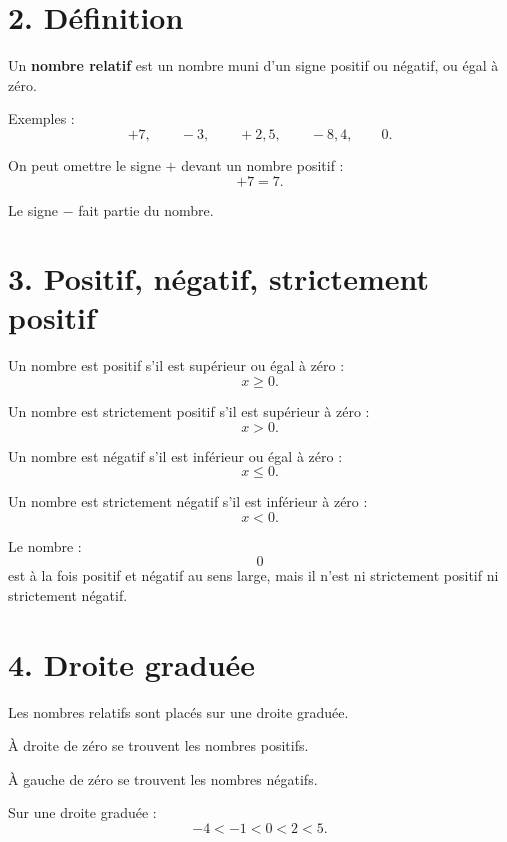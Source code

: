 \section{2. Définition}

\begin{definition}
Un \textbf{nombre relatif} est un nombre muni d'un signe positif ou négatif, ou égal à zéro.
\end{definition}

Exemples :
\[
+7,\qquad -3,\qquad +2{,}5,\qquad -8{,}4,\qquad 0.
\]

On peut omettre le signe $+$ devant un nombre positif :
\[
+7=7.
\]

Le signe $-$ fait partie du nombre.

\section{3. Positif, négatif, strictement positif}

Un nombre est positif s'il est supérieur ou égal à zéro :
\[
x\ge0.
\]

Un nombre est strictement positif s'il est supérieur à zéro :
\[
x>0.
\]

Un nombre est négatif s'il est inférieur ou égal à zéro :
\[
x\le0.
\]

Un nombre est strictement négatif s'il est inférieur à zéro :
\[
x<0.
\]

\begin{attention}
Le nombre :
\[
0
\]
est à la fois positif et négatif au sens large, mais il n'est ni strictement positif ni strictement négatif.
\end{attention}

\section{4. Droite graduée}

Les nombres relatifs sont placés sur une droite graduée.


À droite de zéro se trouvent les nombres positifs.

À gauche de zéro se trouvent les nombres négatifs.

Sur une droite graduée :
\[
-4<-1<0<2<5.
\]

